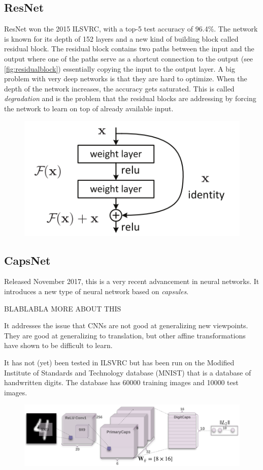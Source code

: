 \subsection{ResNet}
ResNet won the 2015 ILSVRC, with a top-5 test accuracy of 96.4\%. The network is known for its depth of 152 layers and a new kind of building block called residual block. The residual block contains two paths between the input and the output where one of the paths serve as a shortcut connection to the output (see \autoref{fig:residualblock}) essentially copying the input to the output layer. A big problem with very deep networks is that they are hard to optimize. When the depth of the network increases, the accuracy gets saturated. This is called \emph{degradation} and is the problem that the residual blocks are addressing by forcing the network to learn on top of already available input. 

\begin{figure}[H]
	\centering
	\includegraphics[width=0.5\linewidth]{fig/residual.png}
	\label{fig:residualblock}
\end{figure}


\subsection{CapsNet}
Released November 2017, this is a very recent advancement in neural networks. It introduces a new type of neural network based on \emph{capsules}. 

BLABLABLA MORE ABOUT THIS

It addresses the issue that CNNs are not good at generalizing new viewpoints. They are good at generalizing to translation, but other affine transformations have shown to be difficult to learn. 


It has not (yet) been tested in ILSVRC but has been run on the Modified Institute of Standards and Technology database (MNIST) that is a database of handwritten digits. The database has 60000 training images and 10000 test images. 

\begin{figure}[H]
	\centering
	\includegraphics[width=0.7\linewidth]{fig/capsnet.png}
	\label{fig:capsnet}
\end{figure}


